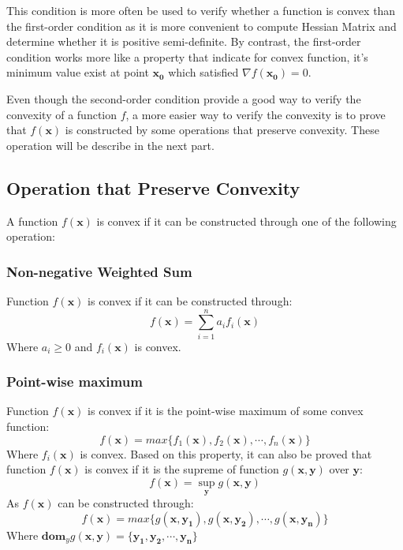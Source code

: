 \documentclass[10pt,a4paper]{article}
\begin{document}
This condition is more often be used to verify whether a function is convex than the first-order condition as it is more convenient to compute Hessian Matrix and determine whether it is positive semi-definite. By contrast, the first-order condition works more like a property that indicate for convex function, it's minimum value exist at point $\mathbf{x_{0}}$ which satisfied $\nabla f(\mathbf{x_{0}}) = 0$.

Even though the second-order condition provide a good way to verify the convexity of a function $f$, a more easier way to verify the convexity is to prove that $f(\mathbf{x})$ is constructed by some operations that preserve convexity. These operation will be describe in the next part.

\subsection{Operation that Preserve Convexity}
A function $f(\mathbf{x})$ is convex if it can be constructed through one of the following operation: 

\subsubsection{Non-negative Weighted Sum}
Function $f(\mathbf{x})$ is convex if it can be constructed through:
\begin{equation*}
	f(\mathbf{x}) = \displaystyle\sum_{i = 1}^{n}a_{i} f_{i}(\mathbf{x})
\end{equation*}
Where $a_{i} \geq 0$ and $f_{i}(\mathbf{x})$ is convex. 

\subsubsection{Point-wise maximum}
Function $f(\mathbf{x})$ is convex if it is the point-wise maximum of some convex function:
\begin{equation*}
	f(\mathbf{x}) = max\{ f_{1}(\mathbf{x}), f_{2}(\mathbf{x}), \cdots, f_{n}(\mathbf{x}) \}
\end{equation*}
Where $f_{i}(\mathbf{x})$ is convex. Based on this property, it can also be proved that function $f(\mathbf{x})$ is convex if it is the supreme of function $g(\mathbf{x}, \mathbf{y})$ over $\mathbf{y}$:
\begin{equation*}
	f(\mathbf{x}) = \displaystyle\sup_{\mathbf{y}}g(\mathbf{x}, \mathbf{y})
\end{equation*}
As $f(\mathbf{x})$ can be constructed through:
\begin{equation*}
	f(\mathbf{x}) = max \{ g(\mathbf{x}, \mathbf{y_{1}}), g(\mathbf{x}, \mathbf{y_{2}}), \cdots, g(\mathbf{x}, \mathbf{y_{n}}) \}
\end{equation*}
Where $\mathbf{dom}_{y}g(\mathbf{x}, \mathbf{y}) = \{ \mathbf{y_{1}}, \mathbf{y_{2}}, \cdots, \mathbf{y_{n}} \}$
\end{document}
